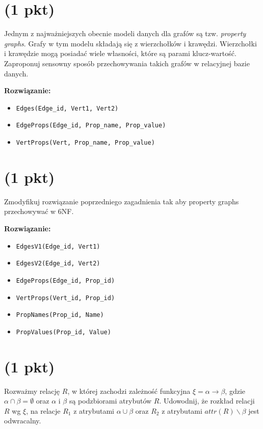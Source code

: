 \documentclass{article}
\begin{document}
\section{(1 pkt)} Jednym z najważniejszych obecnie modeli danych dla grafów są tzw. \textit{property graphs}. Grafy w tym modelu składają się z wierzchołków i krawędzi. Wierzchołki i krawędzie mogą posiadać wiele własności, które są parami klucz-wartość. Zaproponuj sensowny sposób przechowywania takich grafów w relacyjnej bazie danych.

\textbf{Rozwiązanie:} \begin{itemize}
        \item \texttt{Edges(Edge\_id, Vert1, Vert2)}
        \item \texttt{EdgeProps(Edge\_id, Prop\_name, Prop\_value)}
        \item \texttt{VertProps(Vert, Prop\_name, Prop\_value)}
\end{itemize}

\section{(1 pkt)} Zmodyfikuj rozwiązanie poprzedniego zagadnienia tak aby property graphs przechowywać w 6NF.

\textbf{Rozwiązanie:} \begin{itemize}
        \item \texttt{EdgesV1(Edge\_id, Vert1)}
        \item \texttt{EdgesV2(Edge\_id, Vert2)}
        \item \texttt{EdgeProps(Edge\_id, Prop\_id)}
        \item \texttt{VertProps(Vert\_id, Prop\_id)}
        \item \texttt{PropNames(Prop\_id, Name)}
        \item \texttt{PropValues(Prop\_id, Value)}
\end{itemize}

\section{(1 pkt)} Rozważmy relację $R$, w której zachodzi zależność funkcyjna $\xi = \alpha \rightarrow \beta$, gdzie $\alpha \cap \beta = \emptyset$ oraz $\alpha$ i $\beta$ są podzbiorami atrybutów $R$. Udowodnij, że rozkład relacji $R$ wg $\xi$, na relacje $R_1$ z atrybutami $\alpha \cup \beta$ oraz $R_2$ z atrybutami $attr(R)\backslash \beta$ jest odwracalny.
\end{document}
